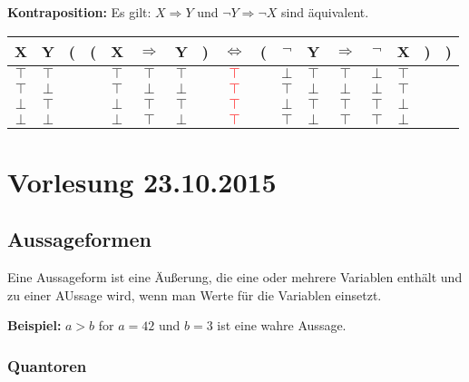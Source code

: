 \documentclass[pdftex,12pt,a4paper,fleqn]{scrartcl}
\begin{document}
\textbf{Kontraposition:}
Es gilt: $X \Rightarrow Y$ und $\neg Y \Rightarrow \neg X$ sind äquivalent.

\begin{tabular}{@{ }c@{ }@{ }c | c@{}@{}c@{}@{ }c@{ }@{ }c@{ }@{ }c@{ }@{}c@{}@{ }c@{ }@{}c@{}@{ }c@{ }@{ }c@{ }@{ }c@{ }@{ }c@{ }@{ }c@{ }@{}c@{}@{}c@{ }}
X & Y & ( & ( & X & $\Rightarrow$ & Y & ) & $\Leftrightarrow$ & ( & $\neg$ & Y & $\Rightarrow$ & $\neg$ & X & ) & )\\
\hline 
$\top$ & $\top$ &  &  & $\top$ & $\top$ & $\top$ &  & \textcolor{red}{$\top$} &  & $\bot$ & $\top$ & $\top$ & $\bot$ & $\top$ &  & \\
$\top$ & $\bot$ &  &  & $\top$ & $\bot$ & $\bot$ &  & \textcolor{red}{$\top$} &  & $\top$ & $\bot$ & $\bot$ & $\bot$ & $\top$ &  & \\
$\bot$ & $\top$ &  &  & $\bot$ & $\top$ & $\top$ &  & \textcolor{red}{$\top$} &  & $\bot$ & $\top$ & $\top$ & $\top$ & $\bot$ &  & \\
$\bot$ & $\bot$ &  &  & $\bot$ & $\top$ & $\bot$ &  & \textcolor{red}{$\top$} &  & $\top$ & $\bot$ & $\top$ & $\top$ & $\bot$ &  & \\
\end{tabular}




\newpage
\section{Vorlesung 23.10.2015} %
\label{sec:vorlesung_23_10_2015}

\subsection{Aussageformen} %
\label{sub:aussageformen}

Eine Aussageform ist eine Äußerung, die eine oder mehrere Variablen enthält und zu einer AUssage wird, wenn man Werte für die Variablen einsetzt.

\textbf{Beispiel: } $ a > b$ for $a = 42$ und $b = 3$ ist eine wahre Aussage.

\subsubsection{Quantoren} %
\label{ssub:quantoren}
\end{document}
